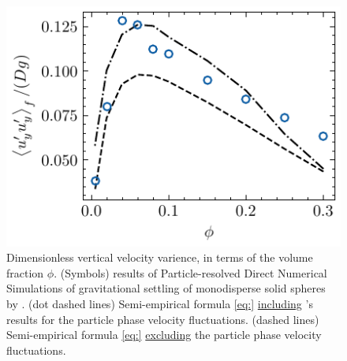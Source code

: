 \begin{figure}
    \centering
    \includegraphics[height = 0.25\textwidth]{image/HOMOGENEOUS_final/CA/tariq.pdf}
    \caption{Dimensionless vertical velocity varience, in terms of the volume fraction $\phi$. 
    (Symbols) results of Particle-resolved Direct Numerical Simulations  of gravitational settling of monodisperse solid spheres by \citet{shajahan2023inertial}. 
    (dot dashed lines) Semi-empirical formula \ref{eq:} \underline{including} \citet{shajahan2023inertial}'s results for the particle phase velocity fluctuations. 
    (dashed lines) Semi-empirical formula \ref{eq:} \underline{excluding} the particle phase velocity fluctuations. 
    }
    \label{fig:tariq}
\end{figure}
